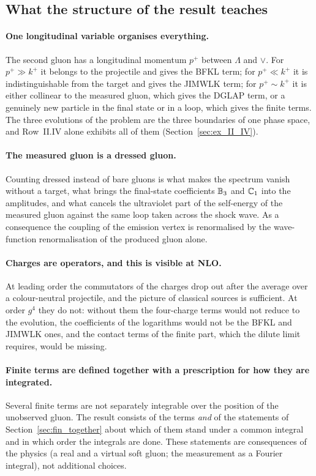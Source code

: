 \subsection{What the structure of the result teaches}\label{sec:disc_lessons}

\paragraph{One longitudinal variable organises everything.} The second gluon has a longitudinal momentum $p^+$ between $\Lambda$ and $\vee$. For $p^+\gg k^+$ it belongs to the projectile and gives the BFKL term; for $p^+\ll k^+$ it is indistinguishable from the target and gives the JIMWLK term; for $p^+\sim k^+$ it is either collinear to the measured gluon, which gives the DGLAP term, or a genuinely new particle in the final state or in a loop, which gives the finite terms. The three evolutions of the problem are the three boundaries of one phase space, and Row~II.IV alone exhibits all of them (Section~\ref{sec:ex_II_IV}).

\paragraph{The measured gluon is a dressed gluon.} Counting dressed instead of bare gluons is what makes the spectrum vanish without a target, what brings the final-state coefficients $\mathbb{B}_3$ and $\mathbb{C}_1$ into the amplitudes, and what cancels the ultraviolet part of the self-energy of the measured gluon against the same loop taken across the shock wave. As a consequence the coupling of the emission vertex is renormalised by the wave-function renormalisation of the produced gluon alone.

\paragraph{Charges are operators, and this is visible at NLO.} At leading order the commutators of the charges drop out after the average over a colour-neutral projectile, and the picture of classical sources is sufficient. At order $g^4$ they do not: without them the four-charge terms would not reduce to the evolution, the coefficients of the logarithms would not be the BFKL and JIMWLK ones, and the contact terms of the finite part, which the dilute limit requires, would be missing.

\paragraph{Finite terms are defined together with a prescription for how they are integrated.} Several finite terms are not separately integrable over the position of the unobserved gluon. The result consists of the terms \emph{and} of the statements of Section~\ref{sec:fin_together} about which of them stand under a common integral and in which order the integrals are done. These statements are consequences of the physics (a real and a virtual soft gluon; the measurement as a Fourier integral), not additional choices.

